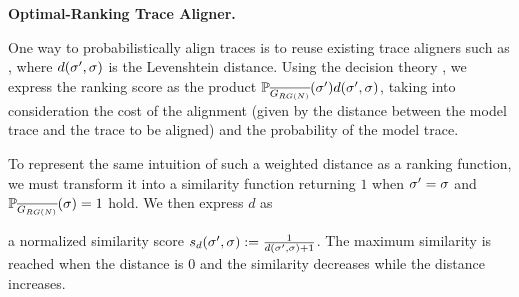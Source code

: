 \vspace{+0.2cm}
\noindent
\textbf{Optimal-Ranking Trace Aligner.}\label{subsec:eta}
{One way to probabilistically align traces is to reuse existing trace aligners such as \cite{DBLP:conf/edoc/AdriansyahDA11,LeoniM17}, where $d({\sigma'},\sigma)$ is the Levenshtein distance.
Using the decision theory \cite{dectheor}, we express the ranking score as the product $\mathbb{P}_{\overline{G_{RG(N)}}}({\sigma'}) d({\sigma'},\sigma)$, taking into consideration the cost of the alignment (given by the distance between the model trace and the trace to be aligned) and the probability of the model trace.

To represent the same intuition of such a weighted distance as a ranking function, we must transform it into a
similarity function returning $1$ when ${\sigma'}=\sigma$ and $\mathbb{P}_{\overline{G_{RG(N)}}}(\sigma)=1$ hold. We then express $d$ as}
a normalized similarity score $s_d({\sigma'},\sigma):=\frac{1}{d({\sigma'},\sigma)+1}$. The maximum similarity is reached when the distance is $0$ and the similarity decreases while the distance increases. %
